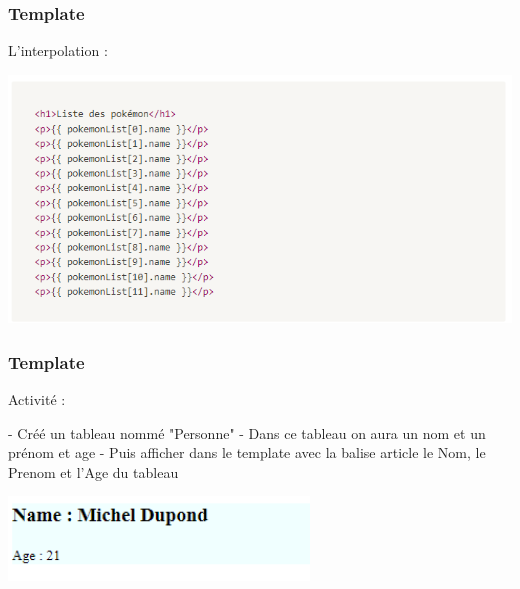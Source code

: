 \documentclass[10pt]{beamer}
\begin{document}
	\begin{frame}
		\frametitle{Template}

		L'interpolation : \newline

		\centering
		\includegraphics[width=14cm]{assets/inter2} \newline


	\end{frame}

	\begin{frame}
		\frametitle{Template}

		Activité : \newline \newline

		- Créé un tableau nommé "Personne" \newline
		- Dans ce tableau on aura un nom et un prénom et age \newline
		- Puis afficher dans le template avec la balise article le Nom, le Prenom et l'Age du tableau \newline \newline

		\centering
		\includegraphics[width=8cm]{assets/exempleAct} \newline


	\end{frame}
\end{document}
